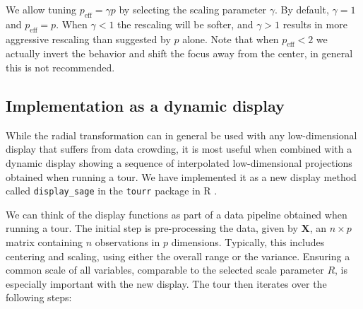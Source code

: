 \documentclass[]{interact}
\theoremstyle{plain}%
\theoremstyle{definition}
\theoremstyle{remark}
\begin{document}
We allow tuning \(p_{\mathrm{eff}} = \gamma p\) by selecting the scaling
parameter \(\gamma\). By default, \(\gamma=1\) and
\(p_{\mathrm{eff}}=p\). When \(\gamma<1\) the rescaling will be softer,
and \(\gamma>1\) results in more aggressive rescaling than suggested by
\(p\) alone. Note that when \(p_{\mathrm{eff}} < 2\) we actually invert
the behavior and shift the focus away from the center, in general this
is not recommended.

\hypertarget{sec:implementation}{%
\subsection{Implementation as a dynamic
display}\label{sec:implementation}}

While the radial transformation can in general be used with any
low-dimensional display that suffers from data crowding, it is most
useful when combined with a dynamic display showing a sequence of
interpolated low-dimensional projections obtained when running a tour.
We have implemented it as a new display method called
\texttt{display\_sage} in the \texttt{tourr} package \citep{tourr} in R
\citep{rref}.

We can think of the display functions as part of a data pipeline
obtained when running a tour. The initial step is pre-processing the
data, given by \(\mathbf{X}\), an \(n \times p\) matrix containing \(n\)
observations in \(p\) dimensions. Typically, this includes centering and
scaling, using either the overall range or the variance. Ensuring a
common scale of all variables, comparable to the selected scale
parameter \(R\), is especially important with the new display. The tour
then iterates over the following steps:
\end{document}

